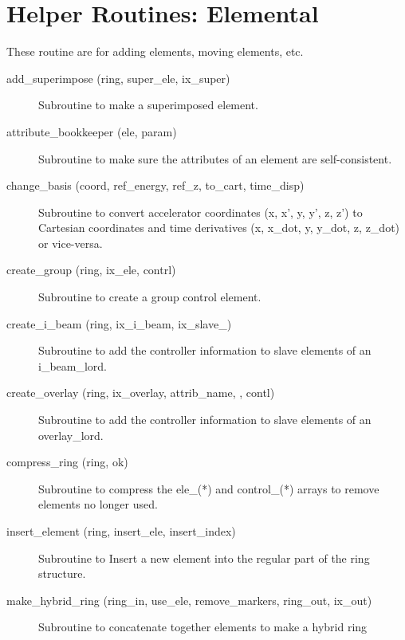 \section{Helper Routines: Elemental}
\label{r:elem}     

These routine are for adding elements, moving elements, etc.

\begin{description}

\item[add\_superimpose (ring, super\_ele, ix\_super)] \Newline
Subroutine to make a superimposed element. 

\item[attribute\_bookkeeper (ele, param)] \Newline
Subroutine to make sure the attributes of an element are self-consistent. 

\item[change\_basis (coord, ref\_energy, ref\_z, to\_cart, time\_disp)] \Newline
Subroutine to convert accelerator coordinates (x, x', y, y', z, z') to
Cartesian coordinates and time derivatives (x, x\_dot, y, y\_dot, z,
z\_dot) or vice-versa.

\item[create\_group (ring, ix\_ele, contrl)] \Newline
Subroutine to create a group control element. 

\item[create\_i\_beam (ring, ix\_i\_beam, ix\_slave\_)] \Newline 
     Subroutine to add the controller information to slave elements of
     an i\_beam\_lord.

\item[create\_overlay (ring, ix\_overlay, attrib\_name, , contl)] \Newline
Subroutine to add the controller information to slave elements of an 
overlay\_lord. 

\item[compress\_ring (ring, ok)] \Newline
Subroutine to compress the ele\_(*) and control\_(*) arrays to remove
elements no longer used.

\item[insert\_element (ring, insert\_ele, insert\_index)] \Newline
Subroutine to Insert a new element into the regular part of the ring structure. 

\item[make\_hybrid\_ring (ring\_in, use\_ele, remove\_markers, ring\_out, ix\_out)] \Newline
Subroutine to concatenate together elements to make a hybrid ring 


\end{description}
